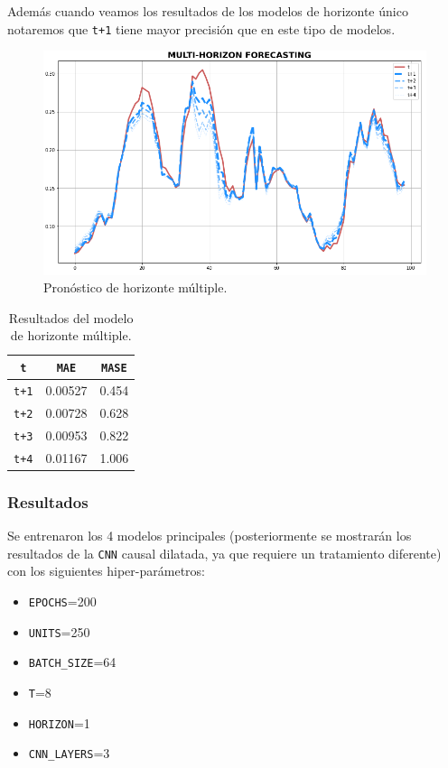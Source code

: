 \documentclass[a4paper,12pt]{article}
\begin{document}
Además cuando veamos los resultados de los modelos de horizonte único notaremos que \texttt{t+1} tiene mayor precisión que en este tipo de modelos.

\begin{figure}[H]
	\begin{center}
	\includegraphics[width=1\textwidth]{multi-horizon-plot.png}
  	\caption{Pronóstico de horizonte múltiple.}
  	\label{fig:multihorizon_plot}
  	\end{center}
\end{figure}

\begin{table}[H]
\centering
\begin{tabular}{ccc}
\hline
\texttt{t} & \texttt{MAE} & \texttt{MASE} \\ \hline
\texttt{t+1}        & 0.00527     & 0.454      \\
\texttt{t+2}        & 0.00728     & 0.628      \\
\texttt{t+3}        & 0.00953     & 0.822      \\
\texttt{t+4}        & 0.01167     & 1.006      \\ \hline
\end{tabular}
\caption{Resultados del modelo de horizonte múltiple.}
\label{tab:multi-horizon-results}
\end{table}

\subsubsection{Resultados}
Se entrenaron los 4 modelos principales (posteriormente se mostrarán los resultados de la \texttt{CNN} causal dilatada, ya que requiere un tratamiento diferente) con los siguientes hiper-parámetros:
\begin{itemize}
	\item \texttt{EPOCHS}=200
	\item \texttt{UNITS}=250
	\item \texttt{BATCH\_SIZE}=64
	\item \texttt{T}=8
	\item \texttt{HORIZON}=1
	\item \texttt{CNN\_LAYERS}=3
\end{itemize}
\end{document}
